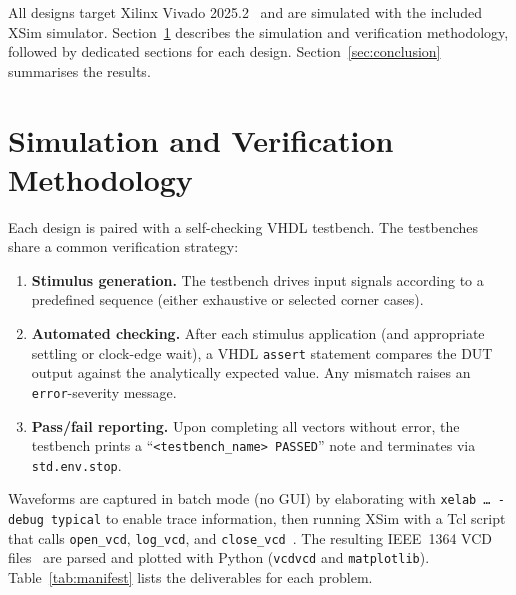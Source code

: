\documentclass[12pt]{article}
\begin{document}
\noindent
All designs target Xilinx Vivado 2025.2~\cite{ug900} and are simulated
with the included XSim simulator. Section~\ref{sec:methodology}
describes the simulation and verification methodology, followed by
dedicated sections for each design. Section~\ref{sec:conclusion}
summarises the results.

\section{Simulation and Verification Methodology}
\label{sec:methodology}

Each design is paired with a self-checking VHDL testbench. The
testbenches share a common verification strategy:

\begin{enumerate}[nosep]
  \item \textbf{Stimulus generation.} The testbench drives input signals
        according to a predefined sequence (either exhaustive or
        selected corner cases).
  \item \textbf{Automated checking.} After each stimulus application
        (and appropriate settling or clock-edge wait), a VHDL
        \texttt{assert} statement compares the DUT output against the
        analytically expected value. Any mismatch raises an
        \texttt{error}-severity message.
  \item \textbf{Pass/fail reporting.} Upon completing all vectors
        without error, the testbench prints a
        ``\texttt{<testbench\_name> PASSED}'' note and terminates
        via \texttt{std.env.stop}.
\end{enumerate}

\noindent
Waveforms are captured in batch mode (no GUI) by elaborating with
\texttt{xelab~\ldots~-debug typical} to enable trace information,
then running XSim with a Tcl script that calls \texttt{open\_vcd},
\texttt{log\_vcd}, and \texttt{close\_vcd}~\cite{ug900}.
The resulting IEEE~1364 VCD files~\cite{ieee1364} are parsed and plotted
with Python (\texttt{vcdvcd} and \texttt{matplotlib}).
Table~\ref{tab:manifest} lists the deliverables for each problem.
\end{document}
